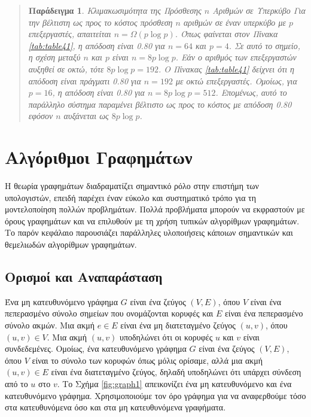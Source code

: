 \documentclass[12pt,a4paper]{article} %
\newtheorem{paradeigma}{Παράδειγμα}
\begin{document}
\begin{quote}
\begin{paradeigma} \label{par:10} Κλιμακωσιμότητα της Πρόσθεσης $n$ 
  Αριθμών σε Υπερκύβο
Για την βέλτιστη ως προς το κόστος πρόσθεση $n$ αριθμών σε έναν υπερκύβο 
με $p$ επεξεργαστές, απαιτείται $n = \Omega(p \log p)$. Όπως φαίνεται στον 
Πίνακα \ref{tab:table41}, η απόδοση είναι 0.80 για $n = 64$ και $p = 4$. 
Σε αυτό το σημείο, η σχέση μεταξύ $n$ και $p$ είναι $n = 8p \log p$. Εάν 
ο αριθμός των επεξεργαστών αυξηθεί σε οκτώ, τότε $8p \log p = 192$. Ο 
Πίνακας \ref{tab:table41} δείχνει ότι η απόδοση είναι πράγματι 0.80 για 
$n = 192$ με οκτώ επεξεργαστές. Ομοίως, για $p = 16$, η απόδοση είναι 
0.80 για $n = 8p \log p = 512$. Επομένως, αυτό το παράλληλο σύστημα 
παραμένει βέλτιστο ως προς το κόστος με απόδοση 0.80 εφόσον $n$ αυξάνεται 
ως $8p \log p$.
\end{paradeigma}
\end{quote}
\vspace{0.2cm}

\section{Αλγόριθμοι Γραφημάτων}
Η θεωρία γραφημάτων διαδραματίζει σημαντικό ρόλο στην επιστήμη των υπολογιστών, επειδή παρέχει έναν εύκολο και συστηματικό τρόπο για τη μοντελοποίηση πολλών προβλημάτων. Πολλά προβλήματα μπορούν να εκφραστούν με όρους γραφημάτων και να επιλυθούν με τη χρήση τυπικών αλγορίθμων γραφημάτων. Το παρόν κεφάλαιο παρουσιάζει παράλληλες υλοποιήσεις κάποιων σημαντικών και θεμελιωδών αλγορίθμων γραφημάτων.

\subsection{Ορισμοί και Αναπαράσταση}
Ένα μη κατευθυνόμενο γράφημα $G$ είναι ένα ζεύγος $(V, E)$, όπου $V$ είναι ένα πεπερασμένο σύνολο σημείων που ονομάζονται κορυφές και $E$ είναι
ένα πεπερασμένο σύνολο ακμών. Μια ακμή $e \in E$
 είναι ένα μη διατεταγμένο ζεύγος $(u, v)$, όπου $(u, v) \in V$. Μια ακμή $(u, v)$
υποδηλώνει ότι οι κορυφές $u$ και $v$ είναι συνδεδεμένες. Ομοίως, ένα κατευθυνόμενο γράφημα $G$ είναι ένα ζεύγος $(V, E)$,
όπου $V$ είναι το σύνολο των κορυφών όπως μόλις ορίσαμε, αλλά μια ακμή $(u, v) \in E$ είναι ένα διατεταγμένο ζεύγος, δηλαδή
υποδηλώνει ότι υπάρχει σύνδεση από το $u$ στο $v$. Το Σχήμα \ref{fig:graph1} απεικονίζει ένα μη κατευθυνόμενο και ένα
κατευθυνόμενο γράφημα. Χρησιμοποιούμε τον όρο γράφημα για να αναφερθούμε τόσο στα κατευθυνόμενα όσο και στα μη κατευθυνόμενα γραφήματα.
\end{document}
